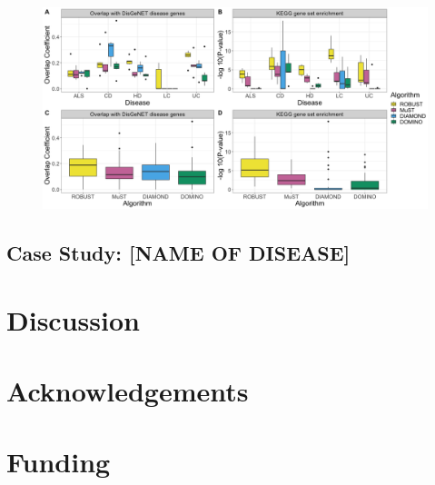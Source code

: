 \documentclass{bioinfo}
\begin{document}
\begin{figure}[htb]
\centering
\includegraphics[width=0.95\linewidth]{img/functional_relevance_all.png}
\caption[]{}
\label{functional_relevance}
\end{figure}


\subsection{Case Study: [NAME OF DISEASE]}

\section{Discussion}


\section*{Acknowledgements}


\section*{Funding}




\end{document}
